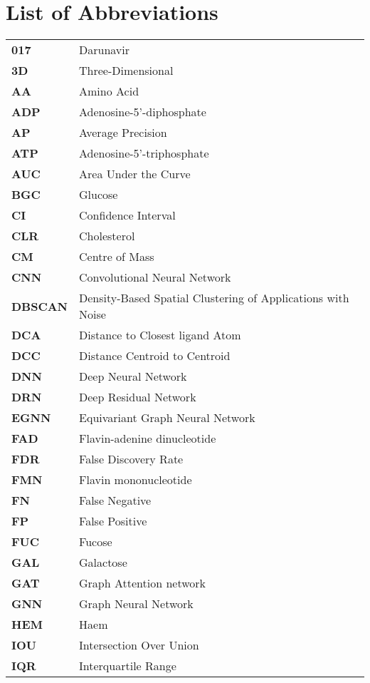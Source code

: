 \chapter*{List of Abbreviations}

\begin{longtable}[l]{@{}p{2.5cm}p{12cm}@{}}
\textbf{017} & Darunavir \\
\textbf{3D} & Three-Dimensional \\
\textbf{AA} & Amino Acid \\
\textbf{ADP} & Adenosine-5'-diphosphate \\
\textbf{AP} & Average Precision \\
\textbf{ATP} & Adenosine-5’-triphosphate \\
\textbf{AUC} & Area Under the Curve \\
\textbf{BGC} & Glucose \\
\textbf{CI} & Confidence Interval \\
\textbf{CLR} & Cholesterol \\
\textbf{CM} & Centre of Mass \\
\textbf{CNN} & Convolutional Neural Network \\
\textbf{DBSCAN} & Density-Based Spatial Clustering of Applications with Noise \\
\textbf{DCA} & Distance to Closest ligand Atom \\
\textbf{DCC} & Distance Centroid to Centroid \\
\textbf{DNN} & Deep Neural Network \\
\textbf{DRN} & Deep Residual Network \\
\textbf{EGNN} & Equivariant Graph Neural Network \\
\textbf{FAD} & Flavin-adenine dinucleotide \\
\textbf{FDR} & False Discovery Rate \\
\textbf{FMN} & Flavin mononucleotide \\
\textbf{FN} & False Negative \\
\textbf{FP} & False Positive \\
\textbf{FUC} & Fucose \\
\textbf{GAL} & Galactose \\
\textbf{GAT} & Graph Attention network \\
\textbf{GNN} & Graph Neural Network \\
\textbf{HEM} & Haem \\
\textbf{IOU} & Intersection Over Union \\
\textbf{IQR} & Interquartile Range \\

\end{longtable}
